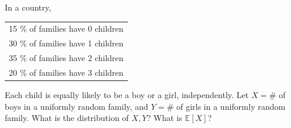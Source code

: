 \begin{eg}
    In a country,
    \begin{table}[H]
        \centering
        \begin{tabular}{c}
               15 \% of families have 0 children   \\
               30 \% of families have 1 children   \\
               35 \% of families have 2 children   \\
               20 \% of families have 3 children   \\
        \end{tabular}
    \end{table}
    Each child is equally likely to be a boy or a girl, independently. Let \(X = \#\) of boys in a uniformly random family, and \(Y = \#\) of girls in a uniformly random family. What is the distribution of \(X, Y\)? What is \(\mathbb{E} [X]\)?    
\end{eg}

